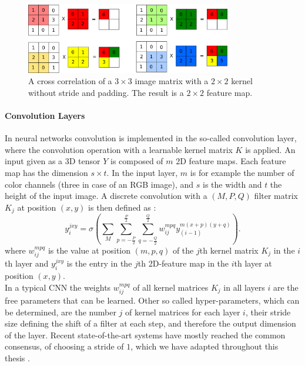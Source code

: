\begin{figure}
	\centering
    	\includegraphics[width=0.8\textwidth]{imgs/convolution.png} 
    \caption[A cross correlation of a $3\times3$ image matrix with a $2\times2$ kernel.]{A cross correlation of a $3\times3$ image matrix with a $2\times2$ kernel without stride and padding. The result is a $2\times2$ feature map.}
	\label{fig:conv}
\end{figure}

\paragraph{Convolution Layers} \label{c:convlayers}

In neural networks convolution is implemented in the so-called convolution layer, where the convolution operation with a learnable kernel matrix $K$ is applied. 
An input given as a 3D tensor $Y$ is composed of $m$ 2D feature maps. Each feature map has the dimension $s \times t$. 
In the input layer, $m$ is for example the number of color channels (three in case of an RGB image), and $s$ is the width and $t$ the height of the input image. 
A discrete convolution with a $(M , P , Q)$ filter matrix $K_j$ at position $(x,y)$ is then defined as : 
\[
y_{i}^{jxy} = \sigma(\sum_M \sum_{p=-\frac{P}{2}}^{\frac{P}{2}} \sum_{q=-\frac{Q}{2}}^{\frac{Q}{2}} w_{ij}^{mpq} y_{(i-1)}^{m(x+p)(y+q)}) .
\]
where $w_{ij}^{mpq}$ is the value at position $(m,p,q)$ of the $j$th kernel matrix $K_j$ in the $i$th layer and $y_{i}^{jxy}$ is the entry in the $j$th 2D-feature map in the $i$th layer at position $(x, y)$.\\
In a typical CNN the weights $w_{ij}^{mpq}$ of all kernel matrices $K_j$ in all layers $i$ are the free parameters that can be learned. 
Other so called hyper-parameters, which can be determined, are the number $j$ of kernel matrices for each layer $i$, their stride size defining the shift of a filter at each step, and therefore the output dimension of the layer.
Recent state-of-the-art systems have mostly reached the common consensus, of choosing a stride of $1$, which we have adapted throughout this thesis \cite{simonyan2014very}.


